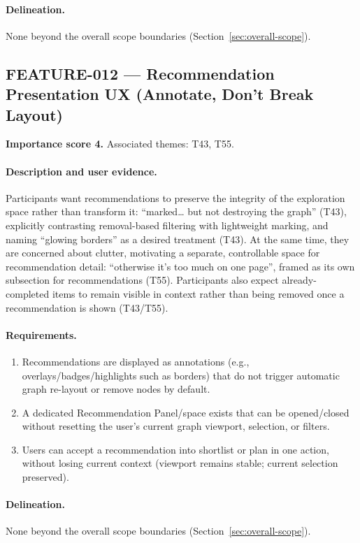 \paragraph{Delineation.}
None beyond the overall scope boundaries (Section~\ref{sec:overall-scope}).

\subsection{FEATURE-012 --- Recommendation Presentation UX (Annotate, Don't Break Layout)}
\label{feat:012}
\textbf{Importance score 4.} Associated themes: T43, T55.

\paragraph{Description and user evidence.}
Participants want recommendations to preserve the integrity of the exploration space rather than transform it: \enquote{marked… but not destroying the graph} (T43), explicitly contrasting removal-based filtering with lightweight marking, and naming \enquote{glowing borders} as a desired treatment (T43). At the same time, they are concerned about clutter, motivating a separate, controllable space for recommendation detail: \enquote{otherwise it's too much on one page}, framed as its own subsection for recommendations (T55). Participants also expect already-completed items to remain visible in context rather than being removed once a recommendation is shown (T43/T55).

\paragraph{Requirements.}
\begin{enumerate}
    \item Recommendations are displayed as annotations (e.g., overlays/badges/highlights such as borders) that do not trigger automatic graph re-layout or remove nodes by default.
    \item A dedicated Recommendation Panel/space exists that can be opened/closed without resetting the user's current graph viewport, selection, or filters.
    \item Users can accept a recommendation into shortlist or plan in one action, without losing current context (viewport remains stable; current selection preserved).
\end{enumerate}

\paragraph{Delineation.}
None beyond the overall scope boundaries (Section~\ref{sec:overall-scope}).

